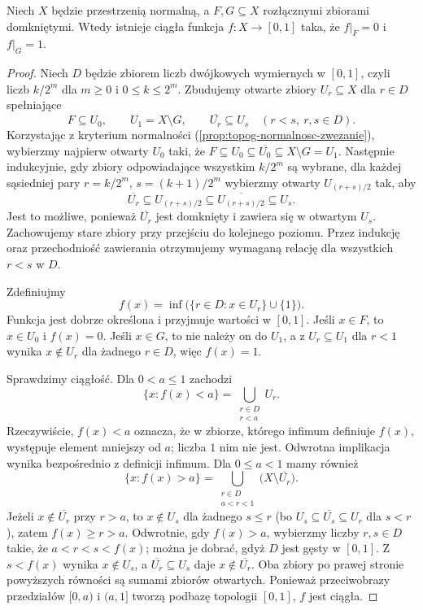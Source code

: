 \begin{twierdzenie}
\label{thm:topog-urysohn}
Niech $X$ będzie przestrzenią normalną, a $F,G\subseteq X$
rozłącznymi zbiorami domkniętymi. Wtedy istnieje
ciągła funkcja $f\colon X\to[0,1]$ taka, że
$f|_F=0$ i $f|_G=1$.
\end{twierdzenie}
\begin{proof}
Niech $D$ będzie zbiorem liczb dwójkowych wymiernych
w $[0,1]$, czyli liczb $k/2^m$ dla $m\ge0$ i
$0\le k\le2^m$. Zbudujemy otwarte zbiory $U_r\subseteq X$
dla $r\in D$ spełniające
\[
F\subseteq U_0,\qquad U_1=X\setminus G,\qquad
\overline{U_r}\subseteq U_s\quad(r<s,\ r,s\in D).
\]
Korzystając z kryterium normalności
(\ref{prop:topog-normalnosc-zwezanie}), wybierzmy najpierw
otwarty $U_0$ taki, że
$F\subseteq U_0\subseteq\overline{U_0}\subseteq X\setminus G=U_1$.
Następnie indukcyjnie, gdy zbiory odpowiadające wszystkim
$k/2^m$ są wybrane, dla każdej sąsiedniej pary
$r=k/2^m$, $s=(k+1)/2^m$ wybierzmy otwarty
$U_{(r+s)/2}$ tak, aby
\[
\overline{U_r}\subseteq U_{(r+s)/2}
\subseteq\overline{U_{(r+s)/2}}\subseteq U_s.
\]
Jest to możliwe, ponieważ $\overline{U_r}$ jest domknięty
i zawiera się w otwartym $U_s$. Zachowujemy stare zbiory
przy przejściu do kolejnego poziomu. Przez indukcję
oraz przechodniość zawierania otrzymujemy wymaganą
relację dla wszystkich $r<s$ w $D$.

Zdefiniujmy
\[
f(x)=\inf\bigl(\{r\in D:x\in U_r\}\cup\{1\}\bigr).
\]
Funkcja jest dobrze określona i przyjmuje wartości w $[0,1]$.
Jeśli $x\in F$, to $x\in U_0$ i $f(x)=0$.
Jeśli $x\in G$, to nie należy on do $U_1$,
a z $U_r\subseteq U_1$ dla $r<1$ wynika
$x\notin U_r$ dla żadnego $r\in D$, więc $f(x)=1$.

Sprawdzimy ciągłość. Dla $0<a\le1$ zachodzi
\[
\{x:f(x)<a\}=\bigcup_{\substack{r\in D\\r<a}}U_r.
\]
Rzeczywiście, $f(x)<a$ oznacza, że w zbiorze, którego
infimum definiuje $f(x)$, występuje element mniejszy
od $a$; liczba $1$ nim nie jest. Odwrotna implikacja
wynika bezpośrednio z definicji infimum.
Dla $0\le a<1$ mamy również
\[
\{x:f(x)>a\}=\bigcup_{\substack{r\in D\\a<r<1}}
\bigl(X\setminus\overline{U_r}\bigr).
\]
Jeżeli $x\notin\overline{U_r}$ przy $r>a$, to
$x\notin U_s$ dla żadnego $s\le r$ (bo
$U_s\subseteq\overline{U_s}\subseteq U_r$ dla $s<r$),
zatem $f(x)\ge r>a$.
Odwrotnie, gdy $f(x)>a$, wybierzmy liczby
$r,s\in D$ takie, że $a<r<s<f(x)$; można je dobrać,
gdyż $D$ jest gęsty w $[0,1]$.
Z $s<f(x)$ wynika $x\notin U_s$, a
$\overline{U_r}\subseteq U_s$ daje
$x\notin\overline{U_r}$. Oba zbiory po prawej stronie
powyższych równości są sumami zbiorów otwartych.
Ponieważ przeciwobrazy przedziałów $[0,a)$ i $(a,1]$
tworzą podbazę topologii $[0,1]$, $f$ jest ciągła.
\end{proof}


